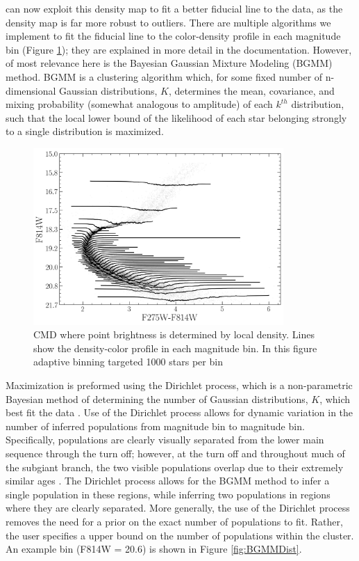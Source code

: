 \fidanka can now exploit this density map to fit a better fiducial line to the
data, as the density map is far more robust to outliers. There are multiple
algorithms we implement to fit the fiducial line to the color-density profile
in each magnitude bin (Figure \ref{densityBinsDemo}); they are explained in
more detail in the \fidanka documentation. However, of most relevance here is
the Bayesian Gaussian Mixture Modeling (BGMM) method. BGMM is a clustering
algorithm which, for some fixed number of n-dimensional Gaussian distributions,
$K$, determines the mean, covariance, and mixing probability (somewhat
analogous to amplitude) of each $k^{th}$ distribution, such that the local
lower bound of the likelihood of each star belonging strongly to a single
distribution is maximized. 

\begin{figure}
	\centering
	\includegraphics[width=0.85\textwidth]{figures/ngc2808/notebookFigures/DensityBinsDemo.png}
	\caption{CMD where point brightness is determined by local density. Lines show the
	density-color profile in each magnitude bin. In this figure adaptive
	binning targeted 1000 stars per bin}
	\label{densityBinsDemo}
\end{figure}

Maximization is preformed using the Dirichlet process, which is a
non-parametric Bayesian method of determining the number of Gaussian
distributions, $K$, which best fit the data \citep{Ferguson1973, scikit-learn}.
Use of the Dirichlet process allows for dynamic variation in the number of
inferred populations from magnitude bin to magnitude bin. Specifically,
populations are clearly visually separated from the lower main sequence through
the turn off; however, at the turn off and throughout much of the subgiant
branch, the two visible populations overlap due to their extremely similar ages
\citep[i.e.][]{Jordan2002}. The Dirichlet process allows for the BGMM method to
infer a single population in these regions, while inferring two populations in
regions where they are clearly separated. More generally, the use of the
Dirichlet process removes the need for a prior on the exact number of
populations to fit. Rather, the user specifies a upper bound on the number of
populations within the cluster. An example bin (F814W = 20.6) is shown in
Figure \ref{fig:BGMMDist}.

